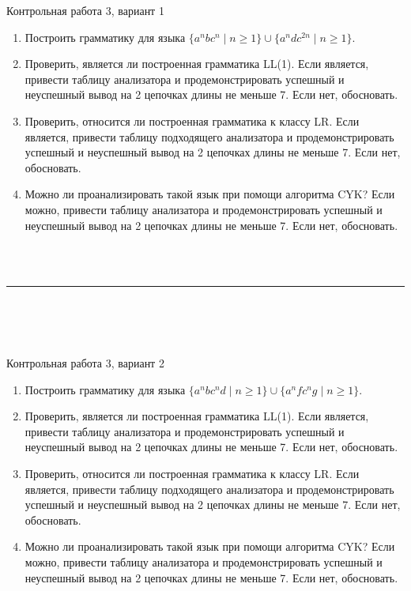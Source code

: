 \documentclass[12pt]{article}
\begin{document}

{\Large Контрольная работа 3, вариант 1}
\bigskip



\begin{enumerate}
  \item Построить грамматику для языка $\{ a^n b c^n \mid n \geq 1 \} \cup \{ a^n d c^{2n} \mid n \geq 1 \}$.
  \item Проверить, является ли построенная грамматика LL(1). Если является, привести таблицу анализатора и продемонстрировать успешный и неуспешный вывод на 2 цепочках длины не меньше 7. Если нет, обосновать. 
  \item Проверить, относится ли построенная грамматика к классу LR. Если является, привести таблицу подходящего анализатора и продемонстрировать успешный и неуспешный вывод на 2 цепочках длины не меньше 7. Если нет, обосновать.
  \item Можно ли проанализировать такой язык при помощи алгоритма CYK? Если можно, привести таблицу анализатора и продемонстрировать успешный и неуспешный вывод на 2 цепочках длины не меньше 7. Если нет, обосновать.
\end{enumerate}

\bigskip

~\\~

\bigskip

\rule{\textwidth}{1pt}

\bigskip

~\\~\\~

\bigskip


{\Large Контрольная работа 3, вариант 2}
\bigskip

\begin{enumerate}
  \item Построить грамматику для языка $\{ a^n b c^n d \mid n \geq 1 \} \cup \{ a^n f c^n g \mid n \geq 1 \}$.
  \item Проверить, является ли построенная грамматика LL(1). Если является, привести таблицу анализатора и продемонстрировать успешный и неуспешный вывод на 2 цепочках длины не меньше 7. Если нет, обосновать. 
  \item Проверить, относится ли построенная грамматика к классу LR. Если является, привести таблицу подходящего анализатора и продемонстрировать успешный и неуспешный вывод на 2 цепочках длины не меньше 7. Если нет, обосновать.
  \item Можно ли проанализировать такой язык при помощи алгоритма CYK? Если можно, привести таблицу анализатора и продемонстрировать успешный и неуспешный вывод на 2 цепочках длины не меньше 7. Если нет, обосновать.
\end{enumerate}
\end{document}
